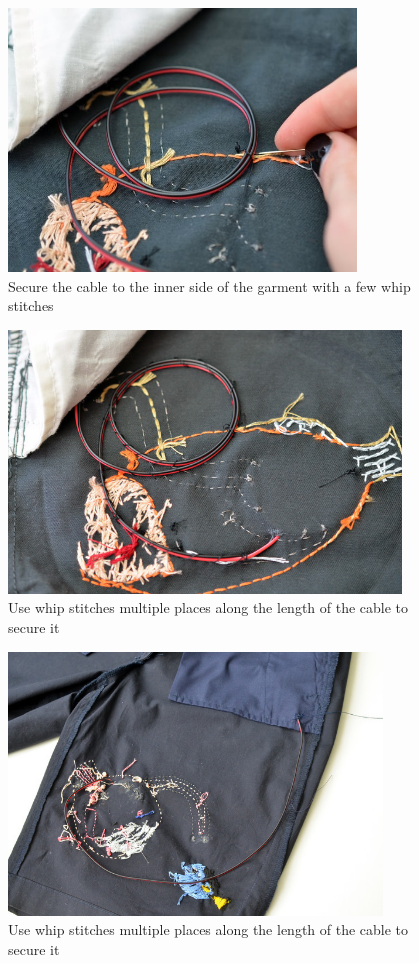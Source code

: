 \documentclass[letterpaper,twoside,12pt]{article}
\begin{document}
\begin{figure}[hbpt]\begin{centering}%
\includegraphics[height=2.75in]{flora-angler-embroidery-32.jpg}
\caption{Secure the cable to the inner side of the garment with a few whip stitches}
\label{fig:flora-angler-embroidery-32}
\end{centering}\end{figure}
\begin{figure}[hbpt]\begin{centering}%
\includegraphics[height=2.75in]{flora-angler-embroidery-33.jpg}
\caption{Use whip stitches multiple places along the length of the cable to 
secure it}
\label{fig:flora-angler-embroidery-33}
\end{centering}\end{figure}
\begin{figure}[hbpt]\begin{centering}%
\includegraphics[height=2.75in]{flora-angler-embroidery-35.jpg}
\caption{Use whip stitches multiple places along the length of the cable to 
secure it}
\label{fig:flora-angler-embroidery-35}
\end{centering}\end{figure}
\end{document}
